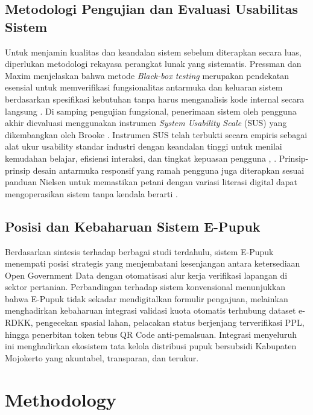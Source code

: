 \documentclass[conference]{IEEEtran}
\begin{document}
\subsection{Metodologi Pengujian dan Evaluasi Usabilitas Sistem}
Untuk menjamin kualitas dan keandalan sistem sebelum diterapkan secara luas, diperlukan metodologi rekayasa perangkat lunak yang sistematis. Pressman dan Maxim menjelaskan bahwa metode \textit{Black-box testing} merupakan pendekatan esensial untuk memverifikasi fungsionalitas antarmuka dan keluaran sistem berdasarkan spesifikasi kebutuhan tanpa harus menganalisis kode internal secara langsung \cite{b13}. Di samping pengujian fungsional, penerimaan sistem oleh pengguna akhir dievaluasi menggunakan instrumen \textit{System Usability Scale} (SUS) yang dikembangkan oleh Brooke \cite{b14}. Instrumen SUS telah terbukti secara empiris sebagai alat ukur usability standar industri dengan keandalan tinggi untuk menilai kemudahan belajar, efisiensi interaksi, dan tingkat kepuasan pengguna \cite{b14}, \cite{b16}. Prinsip-prinsip desain antarmuka responsif yang ramah pengguna juga diterapkan sesuai panduan Nielsen untuk memastikan petani dengan variasi literasi digital dapat mengoperasikan sistem tanpa kendala berarti \cite{b15}.

\subsection{Posisi dan Kebaharuan Sistem E-Pupuk}
Berdasarkan sintesis terhadap berbagai studi terdahulu, sistem E-Pupuk menempati posisi strategis yang menjembatani kesenjangan antara ketersediaan Open Government Data dengan otomatisasi alur kerja verifikasi lapangan di sektor pertanian. Perbandingan terhadap sistem konvensional menunjukkan bahwa E-Pupuk tidak sekadar mendigitalkan formulir pengajuan, melainkan menghadirkan kebaharuan integrasi validasi kuota otomatis terhubung dataset e-RDKK, pengecekan spasial lahan, pelacakan status berjenjang terverifikasi PPL, hingga penerbitan token tebus QR Code anti-pemalsuan. Integrasi menyeluruh ini menghadirkan ekosistem tata kelola distribusi pupuk bersubsidi Kabupaten Mojokerto yang akuntabel, transparan, dan terukur.


\section{Methodology}
\label{sec:methodology}
\end{document}
